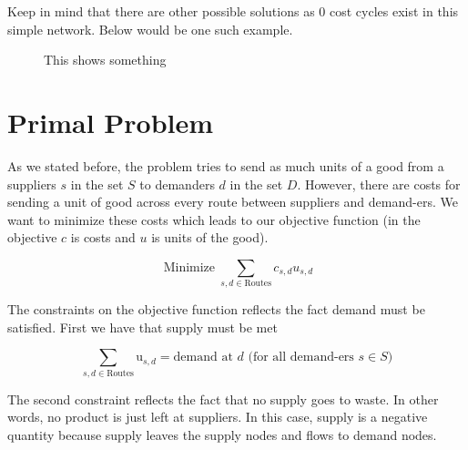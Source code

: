 \documentclass{report}
\begin{document}
Keep in mind that there are other possible solutions as 0 cost cycles exist in this simple network. Below would be one such example.

\begin{figure}
\centering
\begin{framed}

\caption{This shows something}
\end{framed}
\end{figure}







\section{Primal Problem}

As we stated before, the problem tries to send as much units of a good from a suppliers $s$ in the set $S$ to demanders $d$ in the set $D$. However, there are costs for sending a unit of good across every route between suppliers and demand-ers. We want to minimize these costs which leads to our objective function (in the objective $c$ is costs and $u$ is units of the good).

$$\operatorname{Minimize} \sum_{s,d \in \text{Routes}} c_{s,d} u_{s,d}$$

The constraints on the objective function reflects the fact demand must be satisfied. First we have that supply must be met

$$\sum_{s,d \in \text{Routes}} \text{u}_{s,d}= \text{demand at } d \text{ (for all demand-ers } s \in S)$$

The second constraint reflects the fact that no supply goes to waste. In other words, no product is just left at suppliers. In this case, supply is a negative quantity because supply leaves the supply nodes and flows to demand nodes.
\end{document}
